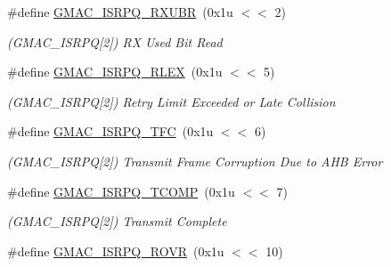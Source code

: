 \begin{DoxyCompactItemize}
\mbox{\label{group__SAME70__GMAC_ga876a4373d00d27e3159e9be88d8de253}} 
\#define \mbox{\hyperlink{group__SAME70__GMAC_ga876a4373d00d27e3159e9be88d8de253}{G\+M\+A\+C\+\_\+\+I\+S\+R\+P\+Q\+\_\+\+R\+X\+U\+BR}}~(0x1u $<$$<$ 2)
\begin{DoxyCompactList}\small\item\em (G\+M\+A\+C\+\_\+\+I\+S\+R\+PQ\mbox{[}2\mbox{]}) RX Used Bit Read \end{DoxyCompactList}\item 
\mbox{\label{group__SAME70__GMAC_ga7f11cdfc1cac98a1cd9ac8bbccb3da23}} 
\#define \mbox{\hyperlink{group__SAME70__GMAC_ga7f11cdfc1cac98a1cd9ac8bbccb3da23}{G\+M\+A\+C\+\_\+\+I\+S\+R\+P\+Q\+\_\+\+R\+L\+EX}}~(0x1u $<$$<$ 5)
\begin{DoxyCompactList}\small\item\em (G\+M\+A\+C\+\_\+\+I\+S\+R\+PQ\mbox{[}2\mbox{]}) Retry Limit Exceeded or Late Collision \end{DoxyCompactList}\item 
\mbox{\label{group__SAME70__GMAC_ga054debe3f58e259af5c39658251051af}} 
\#define \mbox{\hyperlink{group__SAME70__GMAC_ga054debe3f58e259af5c39658251051af}{G\+M\+A\+C\+\_\+\+I\+S\+R\+P\+Q\+\_\+\+T\+FC}}~(0x1u $<$$<$ 6)
\begin{DoxyCompactList}\small\item\em (G\+M\+A\+C\+\_\+\+I\+S\+R\+PQ\mbox{[}2\mbox{]}) Transmit Frame Corruption Due to A\+HB Error \end{DoxyCompactList}\item 
\mbox{\label{group__SAME70__GMAC_ga694920e6cdd037d3c7e074d7f23d7f70}} 
\#define \mbox{\hyperlink{group__SAME70__GMAC_ga694920e6cdd037d3c7e074d7f23d7f70}{G\+M\+A\+C\+\_\+\+I\+S\+R\+P\+Q\+\_\+\+T\+C\+O\+MP}}~(0x1u $<$$<$ 7)
\begin{DoxyCompactList}\small\item\em (G\+M\+A\+C\+\_\+\+I\+S\+R\+PQ\mbox{[}2\mbox{]}) Transmit Complete \end{DoxyCompactList}\item 
\mbox{\label{group__SAME70__GMAC_gabad1f84fcf95f659ab53e3b716369dee}} 
\#define \mbox{\hyperlink{group__SAME70__GMAC_gabad1f84fcf95f659ab53e3b716369dee}{G\+M\+A\+C\+\_\+\+I\+S\+R\+P\+Q\+\_\+\+R\+O\+VR}}~(0x1u $<$$<$ 10)
$$
\end{DoxyCompactItemize}
